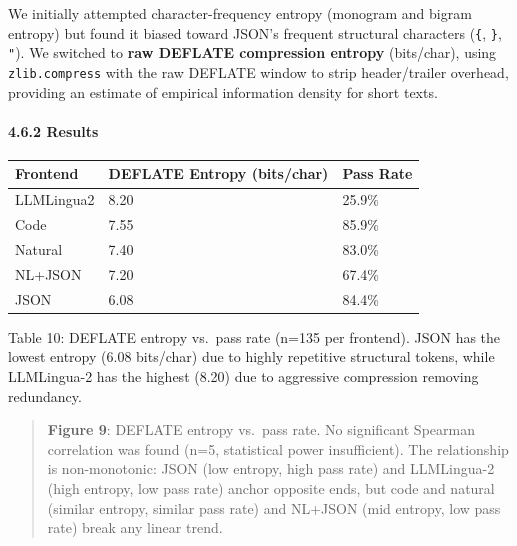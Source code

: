 We initially attempted character-frequency entropy (monogram and bigram entropy) but found it biased toward JSON's frequent structural characters (\texttt{\{}, \texttt{\}}, \texttt{"}). We switched to \textbf{raw DEFLATE compression entropy} (bits/char), using \texttt{zlib.compress} with the raw DEFLATE window to strip header/trailer overhead, providing an estimate of empirical information density for short texts.



\paragraph{4.6.2 Results}\label{results-2}



{\def\LTcaptype{none} %

\begin{longtable}[]{@{}lll@{}}

\toprule\noalign{}

Frontend & DEFLATE Entropy (bits/char) & Pass Rate \\

\midrule\noalign{}

\endhead

\bottomrule\noalign{}

\endlastfoot

LLMLingua2 & 8.20 & 25.9\% \\

Code & 7.55 & 85.9\% \\

Natural & 7.40 & 83.0\% \\

NL+JSON & 7.20 & 67.4\% \\

JSON & 6.08 & 84.4\% \\

\end{longtable}

}



Table 10: DEFLATE entropy vs.~pass rate (n=135 per frontend). JSON has the lowest entropy (6.08 bits/char) due to highly repetitive structural tokens, while LLMLingua-2 has the highest (8.20) due to aggressive compression removing redundancy.



\begin{quote}

\textbf{Figure 9}: DEFLATE entropy vs.~pass rate. No significant Spearman correlation was found (n=5, statistical power insufficient). The relationship is non-monotonic: JSON (low entropy, high pass rate) and LLMLingua-2 (high entropy, low pass rate) anchor opposite ends, but code and natural (similar entropy, similar pass rate) and NL+JSON (mid entropy, low pass rate) break any linear trend.

\end{quote}



